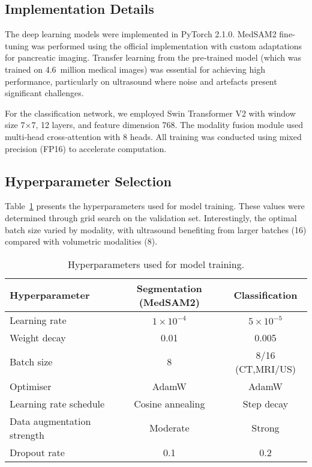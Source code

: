\documentclass[a4paper, fleqn]{cas-dc}
\begin{document}
    \subsection{Implementation Details}
    The deep learning models were implemented in PyTorch 2.1.0. MedSAM2 fine‐tuning
    was performed using the official implementation with custom adaptations for pancreatic
    imaging. Transfer learning from the pre‐trained model (which was trained on 4.6~million
    medical images) was essential for achieving high performance, particularly on
    ultrasound where noise and artefacts present significant challenges.

    For the classification network, we employed Swin Transformer V2 with window
    size 7×7, 12 layers, and feature dimension 768. The modality fusion module
    used multi‐head cross‐attention with 8 heads. All training was conducted using
    mixed precision (FP16) to accelerate computation.

    \subsection{Hyperparameter Selection}
    Table~\ref{tab:hyperparams} presents the hyperparameters used for model training.
    These values were determined through grid search on the validation set. Interestingly,
    the optimal batch size varied by modality, with ultrasound benefiting from larger
    batches (16) compared with volumetric modalities (8).

    \begin{table}[htbp]
        \centering
        \caption{Hyperparameters used for model training.}
        \label{tab:hyperparams}
        \begin{tabular*}{\tblwidth}{@{} lcc @{}}
            \toprule \textbf{Hyperparameter} & \textbf{Segmentation (MedSAM2)} & \textbf{Classification} \\
            \midrule Learning rate           & $1 \times 10^{-4}$              & $5 \times 10^{-5}$      \\
            Weight decay                     & 0.01                            & 0.005                   \\
            Batch size                       & 8                               & 8/16 (CT,MRI/US)        \\
            Optimiser                        & AdamW                           & AdamW                   \\
            Learning rate schedule           & Cosine annealing                & Step decay              \\
            Data augmentation strength       & Moderate                        & Strong                  \\
            Dropout rate                     & 0.1                             & 0.2                     \\
            \bottomrule
        \end{tabular*}
    \end{table}
\end{document}
